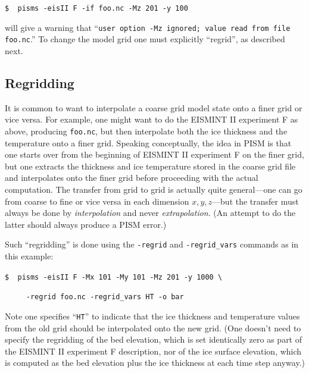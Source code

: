 \documentclass[12pt,final]{amsart}
\begin{document}
\verb|$  pisms -eisII F -if foo.nc -Mz 201 -y 100|

\noindent will give a warning that ``\verb|user option -Mz ignored; value read from file foo.nc|.''  To change the model grid one must explicitly ``regrid'', as described next.

\subsection{Regridding}  It is common to want to interpolate a coarse grid model state onto a finer grid or vice versa.  For example, one might want to do the EISMINT II experiment F as above, producing \verb|foo.nc|, but then interpolate both the ice thickness and the temperature onto a finer grid.  Speaking conceptually, the idea in PISM is that one starts over from the beginning of EISMINT II experiment F on the finer grid, but one extracts the thickness and ice temperature stored in the coarse grid file and interpolates onto the finer grid before proceeding with the actual computation.  The transfer from grid to grid is actually quite general---one can go from coarse to fine or vice versa in each dimension $x,y,z$---but the transfer must always be done by \emph{interpolation} and never \emph{extrapolation}.  (An attempt to do the latter should always produce a PISM error.)

Such ``regridding'' is done using the \verb|-regrid| and \verb|-regrid_vars| commands as in this example:

\verb|$  pisms -eisII F -Mx 101 -My 101 -Mz 201 -y 1000 \|

\verb|     -regrid foo.nc -regrid_vars HT -o bar|

\noindent Note one specifies ``\verb|HT|'' to indicate that the ice thickness and temperature values from the old grid should be interpolated onto the new grid.  (One doesn't need to specify the regridding of the bed elevation, which is set identically zero as part of the EISMINT II experiment F description, nor of the ice surface elevation, which is computed as the bed elevation plus the ice thickness at each time step anyway.)
\end{document}
